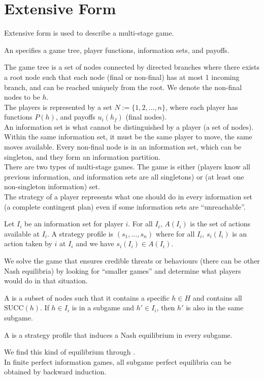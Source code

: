 \section{Extensive Form}
Extensive form is used to describe a multi-stage game.
\begin{definition}
    An  specifies a game tree, player functions, information sets, and payoffs.
\end{definition}
The game tree is a set of nodes connected by directed branches where there exists a root node such that each node (final or non-final) has at most 1 incoming branch, and can be reached uniquely from the root. We denote the non-final nodes to be $h$. \\
The players is represented by a set $N := \{1, 2, \dots, n\}$, where each player has functions $P(h)$, and payoffs $u_i(h_f)$ (final nodes). \\
An information set is what cannot be distinguished by a player (a set of nodes). Within the same information set, it must be the same player to move, the same moves available. Every non-final node is in an information set, which can be singleton, and they form an information partition. \\
There are two types of multi-stage games. The game is either  (players know all previous information, and information sets are all singletons) or  (at least one non-singleton information) set. \\
The strategy of a player represents what one should do in every information set (a complete contingent plan) even if some information sets are ``unreachable''.
\begin{definition}
    Let $I_i$ be an information set for player $i$. For all $I_i$, $A(I_i)$ is the set of actions available at $I_i$. A strategy profile is $(s_1, \dots, s_n)$ where for all $I_i$, $s_i(I_i)$ is an action taken by $i$ at $I_i$ and we have $s_i(I_i) \in A(I_i)$.
\end{definition}
We solve the game that ensures credible threats or behaviours (there can be other Nash equilibria) by looking for ``smaller games'' and determine what players would do in that situation.
\begin{definition}
    A  is a subset of nodes such that it contains a specific $h \in H$ and contains all $\text{SUCC}(h)$. If $h \in I_i$ is in a subgame and $h' \in I_i$, then $h'$ is also in the same subgame.
\end{definition}
\begin{definition}
    A  is a strategy profile that induces a Nash equilibrium in every subgame.
\end{definition}
We find this kind of equilibrium through . \\
In finite perfect information games, all subgame perfect equilibria can be obtained by backward induction.

